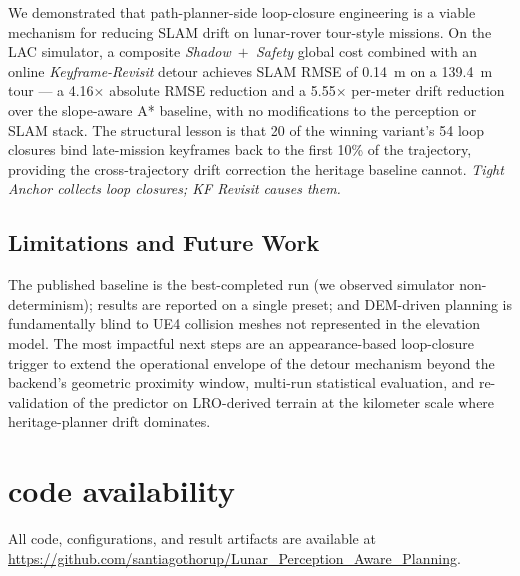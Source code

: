 \documentclass[letterpaper,times]{IONconf}
\begin{document}
We demonstrated that path-planner-side loop-closure engineering is a viable mechanism for reducing SLAM drift on lunar-rover tour-style missions. On the LAC simulator, a composite \emph{Shadow~$+$~Safety} global cost combined with an online \emph{Keyframe-Revisit} detour achieves SLAM RMSE of 0.14~m on a 139.4~m tour --- a 4.16$\times$ absolute RMSE reduction and a 5.55$\times$ per-meter drift reduction over the slope-aware A* baseline, with no modifications to the perception or SLAM stack. The structural lesson is that 20 of the winning variant's 54 loop closures bind late-mission keyframes back to the first 10\% of the trajectory, providing the cross-trajectory drift correction the heritage baseline cannot. \emph{Tight Anchor collects loop closures; KF Revisit causes them.}

\subsection{Limitations and Future Work}

The published baseline is the best-completed run (we observed simulator non-determinism); results are reported on a single preset; and DEM-driven planning is fundamentally blind to UE4 collision meshes not represented in the elevation model. The most impactful next steps are an appearance-based loop-closure trigger to extend the operational envelope of the detour mechanism beyond the backend's geometric proximity window, multi-run statistical evaluation, and re-validation of the predictor on LRO-derived terrain at the kilometer scale where heritage-planner drift dominates.


\section*{code availability}

All code, configurations, and result artifacts are available at \url{https://github.com/santiagothorup/Lunar_Perception_Aware_Planning}.



\setlength{\bibsep}{2pt plus 0.3ex}
\small

\end{document}
